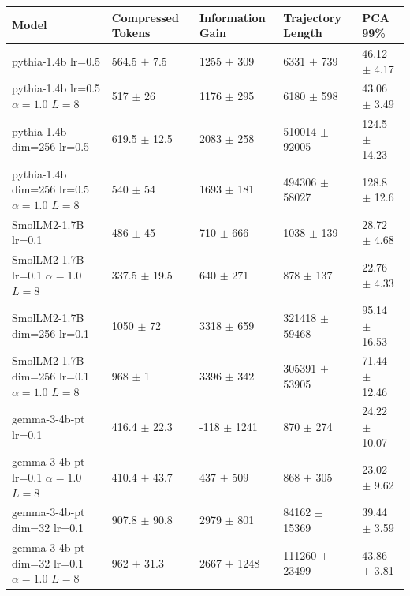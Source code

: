 \begin{tabular}{lllll}
\toprule
 Model                                                                              & Compressed Tokens         & Information Gain         & Trajectory Length           & PCA 99\%                    \\
\midrule
 pythia-1.4b {\small lr=0.5}                                                        & 564.5 {\small $\pm$ 7.5}  & 1255 {\small $\pm$ 309}  & 6331 {\small $\pm$ 739}     & 46.12 {\small $\pm$ 4.17}  \\
 pythia-1.4b {\small lr=0.5} {\small $\alpha=1.0$} {\small $L=8$}                   & 517 {\small $\pm$ 26}     & 1176 {\small $\pm$ 295}  & 6180 {\small $\pm$ 598}     & 43.06 {\small $\pm$ 3.49}  \\
 pythia-1.4b {\small dim=256} {\small lr=0.5}                                       & 619.5 {\small $\pm$ 12.5} & 2083 {\small $\pm$ 258}  & 510014 {\small $\pm$ 92005} & 124.5 {\small $\pm$ 14.23} \\
 pythia-1.4b {\small dim=256} {\small lr=0.5} {\small $\alpha=1.0$} {\small $L=8$}  & 540 {\small $\pm$ 54}     & 1693 {\small $\pm$ 181}  & 494306 {\small $\pm$ 58027} & 128.8 {\small $\pm$ 12.6}  \\
\midrule
 SmolLM2-1.7B {\small lr=0.1}                                                       & 486 {\small $\pm$ 45}     & 710 {\small $\pm$ 666}   & 1038 {\small $\pm$ 139}     & 28.72 {\small $\pm$ 4.68}  \\
 SmolLM2-1.7B {\small lr=0.1} {\small $\alpha=1.0$} {\small $L=8$}                  & 337.5 {\small $\pm$ 19.5} & 640 {\small $\pm$ 271}   & 878 {\small $\pm$ 137}      & 22.76 {\small $\pm$ 4.33}  \\
 SmolLM2-1.7B {\small dim=256} {\small lr=0.1}                                      & 1050 {\small $\pm$ 72}    & 3318 {\small $\pm$ 659}  & 321418 {\small $\pm$ 59468} & 95.14 {\small $\pm$ 16.53} \\
 SmolLM2-1.7B {\small dim=256} {\small lr=0.1} {\small $\alpha=1.0$} {\small $L=8$} & 968 {\small $\pm$ 1}      & 3396 {\small $\pm$ 342}  & 305391 {\small $\pm$ 53905} & 71.44 {\small $\pm$ 12.46} \\
\midrule
 gemma-3-4b-pt {\small lr=0.1}                                                      & 416.4 {\small $\pm$ 22.3} & -118 {\small $\pm$ 1241} & 870 {\small $\pm$ 274}      & 24.22 {\small $\pm$ 10.07} \\
 gemma-3-4b-pt {\small lr=0.1} {\small $\alpha=1.0$} {\small $L=8$}                 & 410.4 {\small $\pm$ 43.7} & 437 {\small $\pm$ 509}   & 868 {\small $\pm$ 305}      & 23.02 {\small $\pm$ 9.62}  \\
 gemma-3-4b-pt {\small dim=32} {\small lr=0.1}                                      & 907.8 {\small $\pm$ 90.8} & 2979 {\small $\pm$ 801}  & 84162 {\small $\pm$ 15369}  & 39.44 {\small $\pm$ 3.59}  \\
 gemma-3-4b-pt {\small dim=32} {\small lr=0.1} {\small $\alpha=1.0$} {\small $L=8$} & 962 {\small $\pm$ 31.3}   & 2667 {\small $\pm$ 1248} & 111260 {\small $\pm$ 23499} & 43.86 {\small $\pm$ 3.81}  \\
\bottomrule
\end{tabular}
